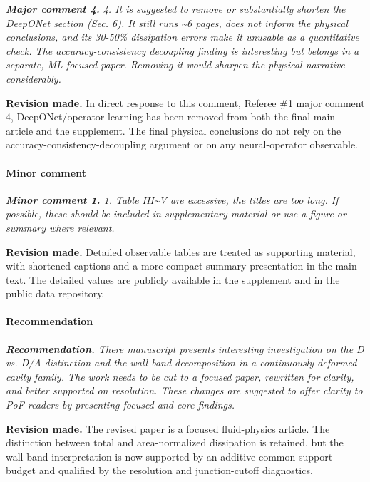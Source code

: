 \documentclass[11pt,a4paper]{article}
\newcommand{\qcomment}[1]{\textcolor{deepblue}{\itshape #1}}
\newcommand{\revwork}[1]{\textbf{\textcolor{revgreen}{#1}}}
\begin{document}
\medskip
\noindent\qcomment{\textbf{Major comment 4.} 4. It is suggested to remove or substantially shorten the DeepONet section (Sec. 6). It still runs \textasciitilde{}6 pages, does not inform the physical conclusions, and its 30-50\% dissipation errors make it unusable as a quantitative check. The accuracy-consistency decoupling finding is interesting but belongs in a separate, ML-focused paper. Removing it would sharpen the physical narrative considerably.}

\noindent\revwork{Revision made.} In direct response to this comment, Referee \#1 major comment 4, DeepONet/operator learning has been removed from both the final main article and the supplement. The final physical conclusions do not rely on the accuracy-consistency-decoupling argument or on any neural-operator observable.

\medskip
\paragraph{Minor comment}

\medskip
\noindent\qcomment{\textbf{Minor comment 1.} 1. Table III\textasciitilde{}V are excessive, the titles are too long. If possible, these should be included in supplementary material or use a figure or summary where relevant.}

\noindent\revwork{Revision made.} Detailed observable tables are treated as supporting material, with shortened captions and a more compact summary presentation in the main text. The detailed values are publicly available in the supplement and in the public data repository.

\medskip
\paragraph{Recommendation}

\medskip
\noindent\qcomment{\textbf{Recommendation.} There manuscript presents interesting investigation on the D vs. D/A distinction and the wall-band decomposition in a continuously deformed cavity family. The work needs to be cut to a focused paper, rewritten for clarity, and better supported on resolution. These changes are suggested to offer clarity to PoF readers by presenting focused and core findings.}

\noindent\revwork{Revision made.} The revised paper is a focused fluid-physics article. The distinction between total and area-normalized dissipation is retained, but the wall-band interpretation is now supported by an additive common-support budget and qualified by the resolution and junction-cutoff diagnostics.
\end{document}
